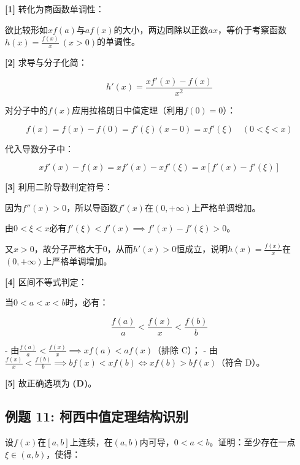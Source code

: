 \documentclass[11pt,a4paper,UTF8]{ctexart}
\begin{document}
\begin{solbox}[分步推导与答题规范]
\textbf{[1]} 转化为商函数单调性：

欲比较形如$xf(a)$与$af(x)$的大小，两边同除以正数$ax$，等价于考察函数$h(x) = \frac{f(x)}{x}\ (x > 0)$的单调性。

\textbf{[2]} 求导与分子化简：


\begin{equation*}
h'(x) = \frac{xf'(x) - f(x)}{x^2}
\end{equation*}


对分子中的$f(x)$应用拉格朗日中值定理（利用$f(0) = 0$）：


\begin{equation*}
f(x) = f(x) - f(0) = f'(\xi)(x - 0) = xf'(\xi) \quad (0 < \xi < x)
\end{equation*}


代入导数分子中：


\begin{equation*}
xf'(x) - f(x) = xf'(x) - xf'(\xi) = x[f'(x) - f'(\xi)]
\end{equation*}


\textbf{[3]} 利用二阶导数判定符号：

因为$f''(x) > 0$，所以导函数$f'(x)$在$(0, +\infty)$上严格单调增加。

由$0 < \xi < x$必有$f'(\xi) < f'(x) \implies f'(x) - f'(\xi) > 0$。

又$x > 0$，故分子严格大于0，从而$h'(x) > 0$恒成立，说明$h(x) = \frac{f(x)}{x}$在$(0, +\infty)$上严格单调增加。

\textbf{[4]} 区间不等式判定：

当$0 < a < x < b$时，必有：


\begin{equation*}
\frac{f(a)}{a} < \frac{f(x)}{x} < \frac{f(b)}{b}
\end{equation*}


- 由$\frac{f(a)}{a} < \frac{f(x)}{x} \implies xf(a) < af(x)$（排除 C）；
- 由$\frac{f(x)}{x} < \frac{f(b)}{b} \implies bf(x) < xf(b) \iff xf(b) > bf(x)$（符合 D）。

\textbf{[5]} 故正确选项为 \textbf{(D)}。
\end{solbox}


\subsection{例题 11: 柯西中值定理结构识别}

设$f(x)$在$[a, b]$上连续，在$(a, b)$内可导，$0 < a < b$。证明：至少存在一点$\xi \in (a, b)$，使得：
\end{document}
